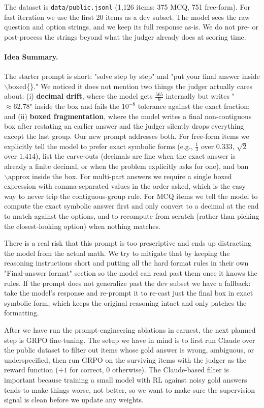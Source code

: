 \documentclass{article}
\begin{document}
The dataset is \texttt{data/public.jsonl} (1{,}126 items: 375 MCQ,
751 free-form). For fast iteration we use the first 20 items as a
dev subset. The model sees the raw question and option strings, and
we keep its full response as-is. We do not pre- or post-process the
strings beyond what the judger already does at scoring time.

\paragraph{Idea Summary.}
The starter prompt is short: "solve step by step" and "put your
final answer inside $\backslash$boxed\{\}." We noticed it does
not mention two things the judger actually cares about:
(i) \textbf{decimal drift}, where the model gets $\tfrac{565}{9}$
internally but writes "$\approx 62.78$" inside the box and fails
the $10^{-8}$ tolerance against the exact fraction; and
(ii) \textbf{boxed fragmentation}, where the model writes a final
non-contiguous box after restating an earlier answer and the judger
silently drops everything except the last group. Our new prompt
addresses both. For free-form items we explicitly tell the model to
prefer exact symbolic forms (e.g., $\boxed{\tfrac{1}{3}}$ over
$\boxed{0.333}$, $\boxed{\sqrt{2}}$ over $\boxed{1.414}$),
list the carve-outs (decimals are fine when the exact answer is
already a finite decimal, or when the problem explicitly asks for
one), and ban $\backslash\text{approx}$ inside the box. For
multi-part answers we require a single boxed expression with
comma-separated values in the order asked, which is the easy way
to never trip the contiguous-group rule. For MCQ items we tell the
model to compute the exact symbolic answer first and only convert to
a decimal at the end to match against the options, and to recompute
from scratch (rather than picking the closest-looking option) when
nothing matches.

There is a real risk that this prompt is too prescriptive and ends
up distracting the model from the actual math. We try to mitigate
that by keeping the reasoning instructions short and putting all the
hard format rules in their own "Final-answer format" section so the
model can read past them once it knows the rules. If the prompt does
not generalize past the dev subset we have a fallback: take the
model's response and re-prompt it to re-cast just the final box in
exact symbolic form, which keeps the original reasoning intact and
only patches the formatting.

After we have run the prompt-engineering ablations in earnest, the
next planned step is GRPO fine-tuning. The setup we have in mind is
to first run Claude over the public dataset to filter out items
whose gold answer is wrong, ambiguous, or underspecified, then run
GRPO on the surviving items with the judger as the reward function
($+1$ for correct, $0$ otherwise). The Claude-based filter is
important because training a small model with RL against noisy gold
answers tends to make things worse, not better, so we want to make
sure the supervision signal is clean before we update any weights.
\end{document}
